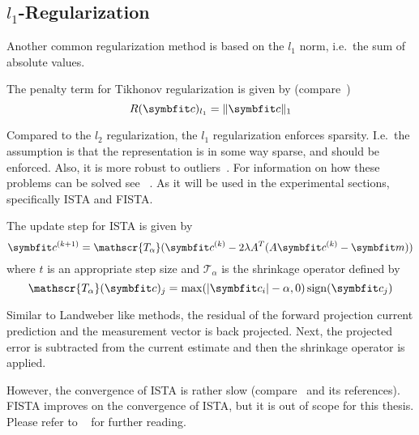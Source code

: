 \subsection{\(l_1\)-Regularization}\label{subsec:l1_regularization}

Another common regularization method is based on the \(l_1\) norm, i.e.\ the sum of absolute
values.
\begin{definition}[\(l_1\)-Regularization]\label{def:l1_regularization}
	The penalty term for Tikhonov regularization is given by
	(compare~\cite{tibshirani_regression_1996,tibshirani_lasso_2013,beck_fast_2009})
	\[
		R(\mvec{c})_{l_1} = \norm{\mvec{c}}_1
	\]
\end{definition}
Compared to the \(l_2\) regularization, the \(l_1\) regularization enforces sparsity. I.e.\ the
assumption is that the representation is in some way sparse, and should be enforced. Also, it is
more robust to outliers~\cite{beck_fast_2009}. For information on how these problems can be solved
see \citeauthor{beck_fast_2009}~\cite{beck_fast_2009}. As it will be used in the experimental
sections, specifically \gls{ISTA} and  \gls{FISTA}.

\begin{definition}[ISTA]\label{def:ista}
	The update step for \gls{ISTA} is given by
	\[
		\mvec{c}^{(k+1)} = \mathscr{T_\alpha} (\mvec{c}^{(k)} - 2 \lambda A^T (A \mvec{c}^{(k)} - \mvec{m}))
	\]
	where \(t\) is an appropriate step size and \(\mathscr{T_\alpha}\) is the shrinkage operator
	defined by
	\[
		\mathscr{T_\alpha}(\mvec{c})_j = \max(\abs{\mvec{c}_i} - \alpha, 0) \sign(\mvec{c}_j)
	\]
\end{definition}
Similar to Landweber like methods, the residual of the forward projection current prediction and the
measurement vector is back projected. Next, the projected error is subtracted from the current
estimate and then the shrinkage operator is applied.

However, the convergence of \gls{ISTA} is rather slow (compare~\cite{beck_fast_2009} and its
references). \gls{FISTA} improves on the convergence of \gls{ISTA}, but it is out of scope for this
thesis. Please refer to \citeauthor{beck_fast_2009}~\cite{beck_fast_2009} for further reading.
